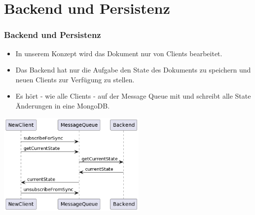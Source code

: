 \section{Backend und Persistenz}
\begin{frame}
    \frametitle{Backend und Persistenz}
    \begin{itemize}
        \item In unserem Konzept wird das Dokument nur von Clients bearbeitet.
        \item Das Backend hat nur die Aufgabe den State des Dokuments zu speichern und neuen Clients zur Verfügung zu stellen.
        \item Es hört - wie alle Clients - auf der Message Queue mit und schreibt alle State Änderungen in eine MongoDB.
    \end{itemize}
    \centering
    \includegraphics[height=5cm]{media/getStateFromBackend}\label{fig:Get State from Backend Diagramm}
\end{frame}
